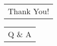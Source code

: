 \begin{frame}[fragile, c]
  \begin{center}
    \begin{tabular}[h]{c}
      \Huge  Thank You!
    \end{tabular}
  \end{center}
\end{frame}

\begin{frame}[fragile, c]
  \begin{center}
    \begin{tabular}[h]{c}
      \Huge Q \& A
    \end{tabular}
  \end{center}
\end{frame}